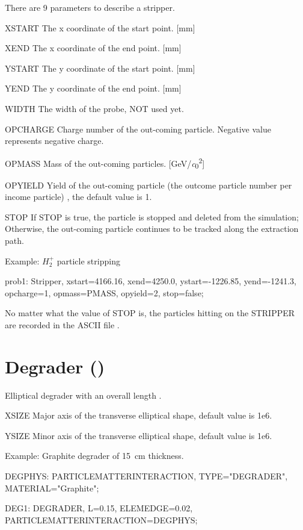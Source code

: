  There are 9 parameters to describe a stripper.
\begin{kdescription}
\item[XSTART]
The x coordinate of the start point. [\si{\milli\meter}]
 \item[XEND]
The x coordinate of the end point. [\si{\milli\meter}]
\item[YSTART]
The y coordinate of the start point. [\si{\milli\meter}]
 \item[YEND]
The y coordinate of the end point. [\si{\milli\meter}]
\item[WIDTH]
 The width of the probe, NOT used yet.
\item[OPCHARGE]
Charge number of the out-coming particle. Negative  value represents negative charge.
\item[OPMASS]
Mass of the out-coming particles. [\si{\giga\electronvolt/\clight\squared}]
\item[OPYIELD]
Yield of the out-coming particle (the outcome particle number per income particle) , the default value is 1.
\item[STOP]
If STOP is true, the particle is stopped and deleted from the simulation;
Otherwise, the out-coming particle continues to be tracked along the extraction path.
\end{kdescription}

\noindent Example: $H_2^+$ particle stripping
\begin{example}
prob1: Stripper, xstart=4166.16, xend=4250.0,
ystart=-1226.85, yend=-1241.3,
opcharge=1, opmass=PMASS, opyield=2, stop=false;
\end{example}

No matter what the value of STOP is, the particles hitting on the STRIPPER are recorded in the ASCII file .



\clearpage
\section{Degrader (\opalt)}
Elliptical degrader with an overall length .
\begin{kdescription}
\item[XSIZE]
\index[XSIZE]
Major axis of the transverse elliptical shape, default value is 1e6.
\item[YSIZE]
Minor axis of the transverse elliptical shape, default value is 1e6.
\end{kdescription}
\noindent Example: Graphite degrader of \SI{15}{\centi\meter} thickness.
\begin{example}
DEGPHYS: PARTICLEMATTERINTERACTION, TYPE="DEGRADER", MATERIAL="Graphite";

DEG1: DEGRADER, L=0.15, ELEMEDGE=0.02, PARTICLEMATTERINTERACTION=DEGPHYS;
\end{example}



